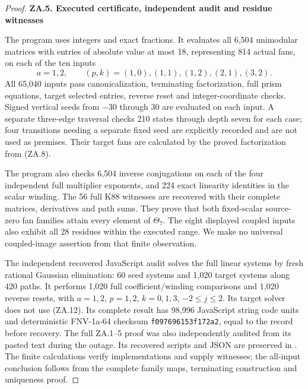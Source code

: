\begin{proof}
\medskip\noindent\textbf{ZA.5. Executed certificate, independent audit and residue witnesses}

\par\nopagebreak[4]

The program  uses integers
and exact fractions. It evaluates all 6,504 unimodular matrices with
entries of absolute value at most 18, representing 814 actual fans,
on each of the ten inputs
\[
a=1,2,\qquad(p,k)=(1,0),(1,1),(1,2),(2,1),(3,2).
\]
All 65,040 inputs pass canonicalization, terminating factorization,
full prism equations, target selected entries, reverse reset and
integer-coordinate checks. Signed vertical seeds from \(-30\)
through \(30\) are evaluated on each input. A separate three-edge
traversal checks 210 states through depth seven for each case; four
transitions needing a separate fixed seed are explicitly recorded
and are not used as premises. Their target fans are calculated by
the proved factorization from (ZA.8).

The program also checks 6,504 inverse conjugations on each of the four
independent full multiplier exponents, and 224 exact linearity
identities in the scalar winding. The 56 full K88 witnesses are
recovered with their complete matrices, derivatives and path sums.
They prove that both fixed-scalar source-zero fan families attain
every element of \(\Theta_7\). The eight displayed coupled inputs
also exhibit all 28 residues within the executed range. We make no
universal coupled-image assertion from that finite observation.

The independent recovered JavaScript audit solves the full linear
systems by fresh rational Gaussian elimination: 60 seed systems and
1,020 target systems along 420 paths. It performs 1,020 full
coefficient/winding comparisons and 1,020 reverse resets, with
\(a=1,2\), \(p=1,2\), \(k=0,1,3\), \(-2\le j\le2\).
Its target solver does not use (ZA.12). Its complete result has
98,996 JavaScript string code units and deterministic FNV-1a-64 checksum
\texttt{f097696153f172a2}, equal to the record before recovery. The full
ZA.1--5 proof was also independently audited from its pasted text
during the outage. Its recovered scripts and JSON are preserved in
. The finite calculations verify implementations
and supply witnesses; the all-input conclusion follows from the
complete family maps, terminating construction and uniqueness proof.

\end{proof}
